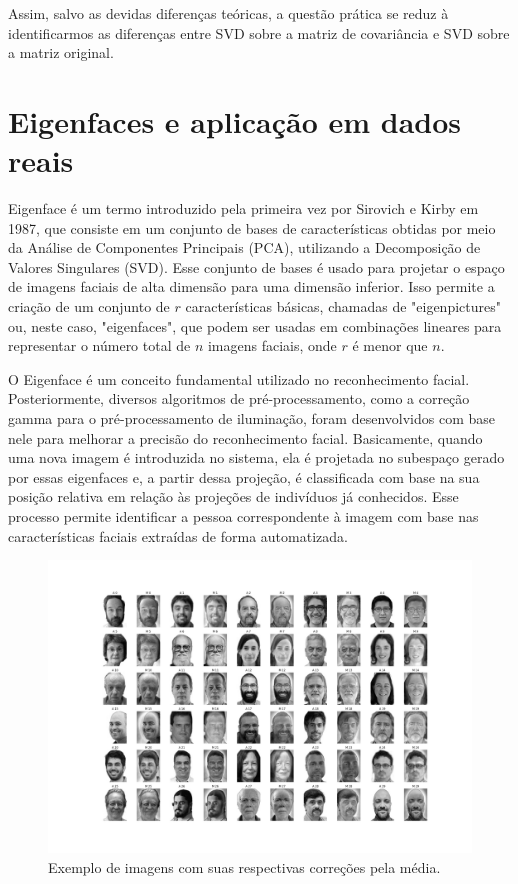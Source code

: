 \documentclass[12pt]{article}
\begin{document}
                 Assim, salvo as devidas diferenças teóricas, a questão prática se reduz à identificarmos as diferenças entre SVD sobre a matriz de covariância e SVD sobre a matriz original.
                   
    \section{Eigenfaces e aplicação em dados reais}
        Eigenface é um termo introduzido pela primeira vez por Sirovich e Kirby em 1987, que consiste em um conjunto de bases de características obtidas por meio da Análise de Componentes Principais (PCA), utilizando a Decomposição de Valores Singulares (SVD). Esse conjunto de bases é usado para projetar o espaço de imagens faciais de alta dimensão para uma dimensão inferior. Isso permite a criação de um conjunto de $r$ características básicas, chamadas de "eigenpictures" ou, neste caso, "eigenfaces", que podem ser usadas em combinações lineares para representar o número total de $n$ imagens faciais, onde $r$ é menor que $n$.
    
        O Eigenface é um conceito fundamental utilizado no reconhecimento facial. Posteriormente, diversos algoritmos de pré-processamento, como a correção gamma para o pré-processamento de iluminação, foram desenvolvidos com base nele para melhorar a precisão do reconhecimento facial. Basicamente, quando uma nova imagem é introduzida no sistema, ela é projetada no subespaço gerado por essas eigenfaces e, a partir dessa projeção, é classificada com base na sua posição relativa em relação às projeções de indivíduos já conhecidos. Esse processo permite identificar a pessoa correspondente à imagem com base nas características faciais extraídas de forma automatizada.

         \begin{figure}[H]
              \centering
              \includegraphics[width=1\textwidth]{img/EMAP_1.png}
              \caption{Exemplo de imagens com suas respectivas correções pela média.}
              \label{fig:exemplo}
        \end{figure}
        
\end{document}
